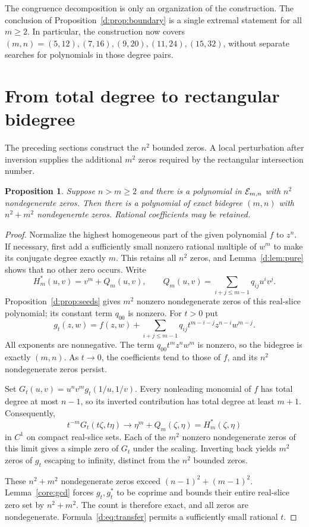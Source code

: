 \documentclass[UTF8,11pt]{ctexart}
\newtheorem{prop}[thm]{Proposition}
\theoremstyle{definition}
\numberwithin{equation}{section}
\begin{document}
The congruence decomposition is only an organization of the construction.
The conclusion of Proposition~\ref{d:prop:boundary} is a single extremal
statement for all $m\ge2$. In particular, the construction now covers
$(m,n)=(5,12),(7,16),(9,20),(11,24),(15,32)$, without separate searches
for polynomials in those degree pairs.

\section{From total degree to rectangular bidegree}\label{d:sec:transfer}

The preceding sections construct the $n^2$ bounded zeros. A local
perturbation after inversion supplies the additional $m^2$ zeros required
by the rectangular intersection number.
\begin{prop}\label{d:prop:transfer}
Suppose $n>m\ge2$ and there is a polynomial in $\mathcal E_{m,n}$ with $n^2$
nondegenerate zeros. Then there is a polynomial of exact bidegree $(m,n)$
with $n^2+m^2$ nondegenerate zeros. Rational coefficients may be retained.
\end{prop}
\begin{proof}
Normalize the highest homogeneous part of the given polynomial $f$ to
$z^n$. If necessary, first add a sufficiently small nonzero rational
multiple of $w^m$ to make its conjugate degree exactly $m$. This retains
all $n^2$ zeros, and Lemma~\ref{d:lem:pure} shows that no other zero occurs.
Write
\[
 H_m^*(u,v)=v^m+Q_m(u,v),\qquad
 Q_m(u,v)=\sum_{i+j\le m-1}q_{ij}u^iv^j.
\]
Proposition~\ref{d:prop:seeds} gives $m^2$ nonzero nondegenerate zeros of
this real-slice polynomial; its constant term $q_{00}$ is nonzero.
For $t>0$ put
\begin{equation}\label{d:eq:transfer}
 g_t(z,w)=f(z,w)+
 \sum_{i+j\le m-1}q_{ij}t^{m-i-j}z^{n-i}w^{m-j}.
\end{equation}
All exponents are nonnegative. The term $q_{00}t^mz^nw^m$ is nonzero,
so the bidegree is exactly $(m,n)$. As $t\to0$, the coefficients tend to
those of $f$, and its $n^2$ nondegenerate zeros persist.

Set $G_t(u,v)=u^nv^mg_t(1/u,1/v)$. Every nonleading monomial of $f$
has total degree at most $n-1$, so its inverted contribution has total
degree at least $m+1$. Consequently,
\[
 t^{-m}G_t(t\zeta,t\eta)\longrightarrow
 \eta^m+Q_m(\zeta,\eta)=H_m^*(\zeta,\eta)
\]
in $C^1$ on compact real-slice sets. Each of the $m^2$ nonzero
nondegenerate zeros of this limit gives a simple zero of $G_t$ under
the scaling. Inverting back yields $m^2$ zeros of $g_t$ escaping to
infinity, distinct from the $n^2$ bounded zeros.

These $n^2+m^2$ nondegenerate zeros exceed
$(n-1)^2+(m-1)^2$. Lemma~\ref{core:gcd} forces $g_t,g_t^*$ to be
coprime and bounds their entire real-slice zero set by $n^2+m^2$.
The count is therefore exact, and all zeros are nondegenerate.
Formula~\eqref{d:eq:transfer} permits a sufficiently small rational $t$.
\end{proof}
\end{document}
